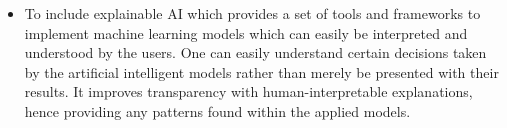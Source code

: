 \documentclass{aifyp}
\begin{document}
\begin{itemize}
    \item To include explainable AI which provides a set of tools and frameworks to implement machine learning models which can easily be interpreted and understood by the users. One can easily understand certain decisions taken by the artificial intelligent models rather than merely be presented with their results. It improves transparency with human-interpretable explanations, hence providing any patterns found within the applied models.
\end{itemize}
\end{document}
